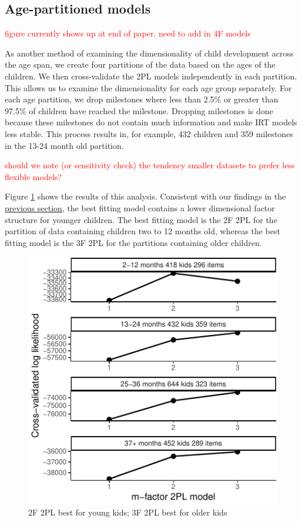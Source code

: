 \documentclass[10pt, letterpaper]{article}
\newenvironment{CodeChunk}{}{}
\begin{document}
\hypertarget{age-partitioned-models}{%
\subsection{Age-partitioned models}\label{age-partitioned-models}}

\textcolor{red}{figure currently shows up at end of paper.}
\textcolor{red}{need to add in 4F models}

As another method of examining the dimensionality of child development
across the age span, we create four partitions of the data based on the
ages of the children. We then cross-validate the 2PL models
independently in each partition. This allows us to examine the
dimensionality for each age group separately. For each age partition, we
drop milestones where less than 2.5\% or greater than 97.5\% of children
have reached the milestone. Dropping milestones is done because these
milestones do not contain much information and make IRT models less
stable. This process results in, for example, 432 children and 359
milestones in the 13-24 month old partition.

\textcolor{red}{should we note (or sensitivity check)}
\textcolor{red}{the tendency smaller datasets}
\textcolor{red}{to prefer less flexible models?}

Figure \ref{fig:partage} shows the results of this analysis. Consistent
with our findings in the \protect\hyperlink{full}{previous section}, the
best fitting model contains a lower dimensional factor structure for
younger children. The best fitting model is the 2F 2PL for the partition
of data containing children two to 12 months old, whereas the best
fitting model is the 3F 2PL for the partitions containing older
children.

\begin{CodeChunk}
\begin{figure}[tb]
\includegraphics{figs/partage-1} \caption[2F 2PL best for young kids]{2F 2PL best for young kids; 3F 2PL best for older kids}\label{fig:partage}
\end{figure}
\end{CodeChunk}
\end{document}
